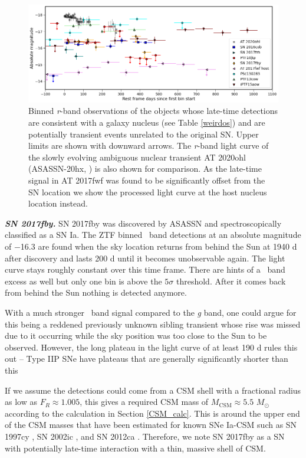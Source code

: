 \documentclass[a4paper,oneside,12pt, class=Latex/Classes/PhDthesisPSnPDF, crop=false]{standalone}
\begin{document}
\begin{figure}
    \centering
    \includegraphics[width=\textwidth]{../Images/chapter_4/ANT_comp.png}
    \caption{Binned \textit{r}-band observations of the objects whose late-time detections are consistent with a galaxy nucleus (see Table \ref{weirdos}) and are potentially transient events unrelated to the original SN. Upper limits are shown with downward arrows. The \textit{r}-band light curve of the slowly evolving ambiguous nuclear transient AT 2020ohl (ASASSN-20hx, \citealt{2020ohl_Hinkle}) is also shown for comparison. As the late-time signal in AT 2017fwf was found to be significantly offset from the SN location we show the processed light curve at the host nucleus location instead.}
    \label{ANT_comp}
\end{figure}


\textit{\textbf{SN 2017fby.}}
SN 2017fby was discovered by ASASSN and spectroscopically classified as a SN Ia. The ZTF binned \ztfr\ band detections at an absolute magnitude of $-$16.3 are found when the sky location returns from behind the Sun at 1940 d after discovery and lasts 200 d until it becomes unobservable again. The light curve stays roughly constant over this time frame. There are hints of a \ztfg\ band excess as well but only one bin is above the $5\sigma$ threshold. After it comes back from behind the Sun nothing is detected anymore.

With a much stronger \ztfr\ band signal compared to the \textit{g} band, one could argue for this being a reddened previously unknown sibling transient whose rise was missed due to it occurring while the sky position was too close to the Sun to be observed. However, the long plateau in the light curve of at least 190 d rules this out -- Type IIP SNe have plateaus that are generally significantly shorter than this \citep{IIL_IIP, SN_II_V_band_lcs}

If we assume the detections could come from a CSM shell with a fractional radius as low as $F_R \approx 1.005$, this gives a required CSM mass of $M_\text{CSM} \approx 5.5$ $M_\odot$ according to the calculation in Section \ref{CSM_calc}. This is around the upper end of the CSM masses that have been estimated for known SNe Ia-CSM such as SN 1997cy \citep{Chugai_2004}, SN 2002ic \citep{Chugai_2004, Inserra_2016}, and SN 2012ca \citep{Inserra_2016}. Therefore, we note SN 2017fby as a SN with potentially late-time interaction with a thin, massive shell of CSM.
\end{document}
